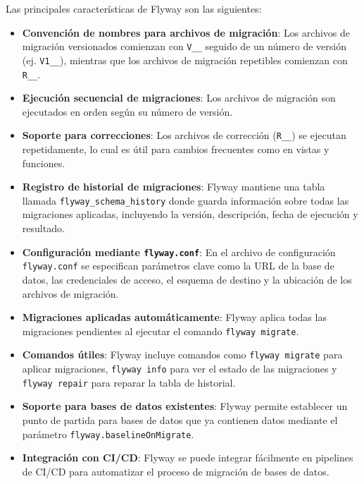\documentclass{IEEEtran}
\begin{document}
Las principales características de Flyway son las siguientes:

\begin{itemize}
    \item \textbf{Convención de nombres para archivos de migración}: Los archivos de migración versionados comienzan con \texttt{V\_\_} seguido de un número de versión (ej. \texttt{V1\_\_}), mientras que los archivos de migración repetibles comienzan con \texttt{R\_\_}.
    \item \textbf{Ejecución secuencial de migraciones}: Los archivos de migración son ejecutados en orden según su número de versión.
    \item \textbf{Soporte para correcciones}: Los archivos de corrección (\texttt{R\_\_}) se ejecutan repetidamente, lo cual es útil para cambios frecuentes como en vistas y funciones.
    \item \textbf{Registro de historial de migraciones}: Flyway mantiene una tabla llamada \texttt{flyway\_schema\_history} donde guarda información sobre todas las migraciones aplicadas, incluyendo la versión, descripción, fecha de ejecución y resultado.
    \item \textbf{Configuración mediante \texttt{flyway.conf}}: En el archivo de configuración \texttt{flyway.conf} se especifican parámetros clave como la URL de la base de datos, las credenciales de acceso, el esquema de destino y la ubicación de los archivos de migración.
    \item \textbf{Migraciones aplicadas automáticamente}: Flyway aplica todas las migraciones pendientes al ejecutar el comando \texttt{flyway migrate}.
    \item \textbf{Comandos útiles}: Flyway incluye comandos como \texttt{flyway migrate} para aplicar migraciones, \texttt{flyway info} para ver el estado de las migraciones y \texttt{flyway repair} para reparar la tabla de historial.
    \item \textbf{Soporte para bases de datos existentes}: Flyway permite establecer un punto de partida para bases de datos que ya contienen datos mediante el parámetro \texttt{flyway.baselineOnMigrate}.
    \item \textbf{Integración con CI/CD}: Flyway se puede integrar fácilmente en pipelines de CI/CD para automatizar el proceso de migración de bases de datos.
\end{itemize}
\end{document}
